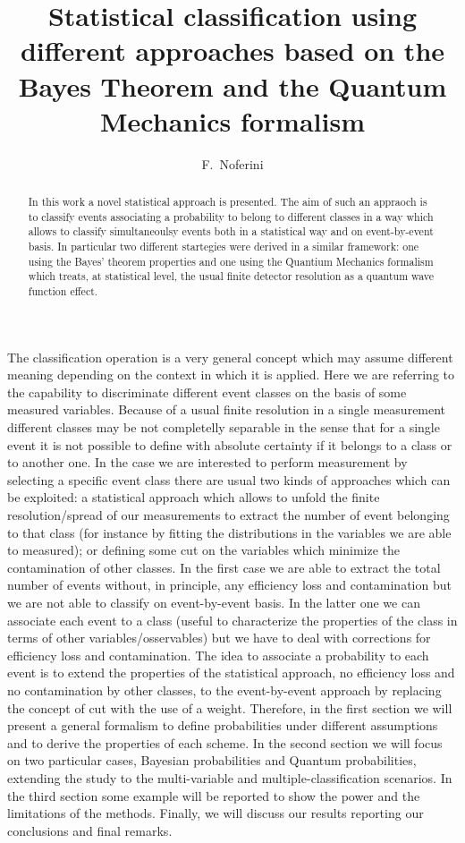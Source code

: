 \documentclass{cimento}
\title{Statistical classification using different approaches based on the Bayes Theorem and the Quantum Mechanics formalism}
\author{F.~Noferini\from{ins:centrofermi}\from{ins:infn}}
\begin{document}
\maketitle                            
\begin{abstract}
In this work a novel statistical approach is presented.
The aim of such an appraoch is to classify events associating a probability to belong to different classes in a way
which allows to classify simultaneoulsy events both in a statistical way and on event-by-event basis.
In particular two different startegies were derived in a similar framework: one using the Bayes' theorem properties
and one using the Quantium Mechanics formalism which treats, at statistical level, the usual finite detector resolution as a quantum
wave function effect.
\end{abstract}



The classification operation is a very general concept which may assume different meaning depending on the context in which
it is applied.
Here we are referring to the capability to discriminate different event classes on the basis of some
measured variables.
Because of a usual finite resolution in a single measurement different classes may be not completelly separable
in the sense that for a single event it is not possible to define with absolute certainty if it belongs to a class
or to another one.
In the case we are interested to perform measurement by selecting a specific event class there are usual two kinds of
approaches which can be exploited: a statistical approach which allows to unfold the finite resolution/spread of our
measurements to extract the number of event belonging to that class (for instance by fitting the distributions in the
variables we are able to measured); or defining some cut on the variables which minimize the contamination of other classes.
In the first case we are able to extract the total number of events without, in principle, any efficiency loss and
contamination but we are not able to classify on event-by-event basis.
In the latter one we can associate each event to a class (useful to characterize the properties of the class in terms of
other variables/osservables) but we have to deal with corrections for efficiency loss and contamination.
The idea to associate a probability to each event is to extend the properties of the statistical approach, no
efficiency loss and no contamination by other classes, to the event-by-event approach by replacing the concept
of cut with the use of a  weight.
Therefore, in the first section we will present a general formalism to define probabilities under different assumptions
and to derive the properties of each scheme.
In the second section we will focus on two particular cases, Bayesian probabilities and Quantum probabilities,
extending the study to the multi-variable and multiple-classification scenarios.
In the third section some example will be reported to show the power and the limitations of the methods.
Finally, we will discuss our results reporting our conclusions and final remarks.
\end{document}
